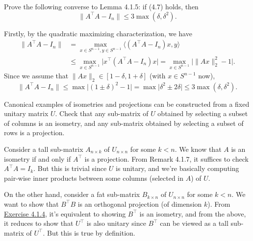 \begin{problem*}[Exercise 4.1.6]\label{ex4.1.6}
	Prove the following converse to Lemma 4.1.5: if (4.7) holds, then
	\[
		\lVert A ^{\top} A - I_n \rVert
		\leq 3 \max (\delta , \delta ^2).
	\]
\end{problem*}
\begin{answer}
	Firstly, by the quadratic maximizing characterization, we have
	\[
		\begin{split}
			\lVert A^{\top} A - I_n \rVert
			 & = \max _{x \in S^{n-1} , y \in S^{n-1}} \langle (A^{\top} A - I_n) x, y \rangle \\
			 & \leq \max _{x \in S^{n-1}} \lvert x^{\top} (A^{\top} A - I_n) x \rvert
			= \max _{x \in S^{n-1}} \lvert \lVert Ax \rVert _2^2 - 1 \rvert .
		\end{split}
	\]
	Since we assume that \(\lVert Ax \rVert _2 \in [1 - \delta , 1 + \delta ]\) (with \(x \in S^{n-1}\) now),
	\[
		\lVert A^{\top} A - I_n \rVert
		\leq \max \lvert (1 \pm \delta )^2 - 1 \rvert
		= \max \lvert \delta ^2 \pm 2\delta  \rvert
		\leq 3 \max (\delta , \delta ^2).
	\]
\end{answer}

\begin{problem*}[Exercise 4.1.8]\label{ex4.1.8}
	Canonical examples of isometries and projections can be constructed from a fixed unitary matrix \(U\). Check that any sub-matrix of \(U\) obtained by selecting a subset of columns is an isometry, and any sub-matrix obtained by selecting a subset of rows is a projection.
\end{problem*}
\begin{answer}
	Consider a tall sub-matrix \(A_{n\times k}\) of \(U_{n \times n}\) for some \(k < n\). We know that \(A\) is an isometry if and only if \(A^{\top} \) is a projection. From Remark 4.1.7, it suffices to check \(A^{\top} A = I_k\). But this is trivial since \(U\) is unitary, and we're basically computing pair-wise inner products between some columns (selected in \(A\)) of \(U\).

	On the other hand, consider a fat sub-matrix \(B_{k \times n}\) of \(U_{n \times n}\) for some \(k < n\). We want to show that \(B ^{\top} B\) is an orthogonal projection (of dimension \(k\)). From \hyperref[ex4.1.4]{Exercise 4.1.4}, it's equivalent to showing \(B^{\top} \) is an isometry, and from the above, it reduces to show that \(U^{\top} \) is also unitary since \(B^{\top} \) can be viewed as a tall sub-matrix of \(U^{\top} \). But this is true by definition.
\end{answer}